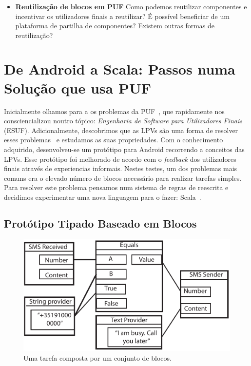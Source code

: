 \documentclass[9pt,a4paper]{extarticle}
\begin{document}
\begin{multicols}{2}
\begin{itemize}
	\item{\textbf{Reutilização de blocos em PUF} 
	Como podemos reutilizar componentes e incentivar os utilizadores finais a reutilizar? É possível beneficiar de um plataforma de partilha de componentes? Existem outras formas de reutilização?}
	
\end{itemize}

\section{De Android a Scala: Passos numa Solução que usa PUF} \label{sec:work}

Inicialmente olhamos para a os problemas da PUF~\cite{Barriers2004}, que rapidamente nos consciencializou noutro tópico: \emph{Engenharia de Software para Utilizadores Finais} (ESUF). Adicionalmente, descobrimos que as LPVs são uma forma de resolver esses problemas~\cite{Navarro2001} e estudamos as suas propriedades. Com o conhecimento adquirido, desenvolveu-se um protótipo para Android recorrendo a conceitos das LPVs. Esse protótipo foi melhorado de acordo com o \emph{feedback} dos utilizadores finais através de experiencias informais.
Nestes testes, um dos problemas mais comuns era o elevado número de blocos necessário para realizar tarefas simples. Para resolver este problema pensamos num sistema de regras de reescrita e decidimos experimentar uma nova linguagem para o fazer: Scala~\cite{ProgrammingScala}.


\subsection{Protótipo Tipado Baseado em Blocos}

\begin{figure}[H]
\centerline{\includegraphics[scale=.40]{block_example.pdf}}
\caption{Uma tarefa composta por um conjunto de blocos.} 
\label{fig:block}
\end{figure}


\end{multicols}
\end{document}
